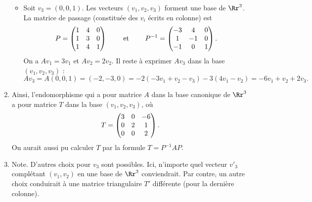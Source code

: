 \documentclass[12pt, class=report,crop=false]{standalone}
\begin{document}
\begin{exemple}
\begin{enumerate}
\begin{itemize}
    \item Soit $v_3=(0,0, 1)$. 
    Les vecteurs $(v_1, v_2, v_3)$ forment une base de $\Rr^3$. 
    La matrice de passage (constituée des $v_i$ écrits en colonne) est  
    $$P=\begin{pmatrix}1&4&0\cr 1&3&0\cr 1&4&1\end{pmatrix}\qquad  \text{ et } \qquad 
P^{-1}=\begin{pmatrix}-3&4&0\cr 1&-1&0\cr -1&0&1\end{pmatrix}.$$ 
On a $Av_1=3v_1$ et $Av_2=2v_2$. Il reste à exprimer $Av_3$ dans la base $(v_1, v_2, v_3)$ :
$$Av_3 = A(0,0,1) = (-2,-3,0) = -2(-3v_1+v_2-v_3)-3(4v_1-v_2) = -6v_1+v_2+2v_3.$$


  \end{itemize}
  
  \item  Ainsi, l'endomorphisme qui a pour matrice $A$ dans la base canonique de $\Rr^3$ a pour matrice $T$ dans la base $(v_1, v_2, v_3)$, où
$$T = \begin{pmatrix}3&0&-6\cr 0&2&1\cr 0&0&2\end{pmatrix}.$$
On aurait aussi pu calculer $T$ par la formule $T=P^{-1}AP$.

     \item Note. D'autres choix pour $v_3$ sont possibles. Ici, n'importe quel vecteur $v'_3$ complétant $(v_1,v_2)$ en une base de $\Rr^3$ conviendrait. Par contre, un autre choix conduirait à une matrice triangulaire $T'$ différente (pour la dernière colonne).
\end{enumerate}
\end{exemple} 
\end{document}

